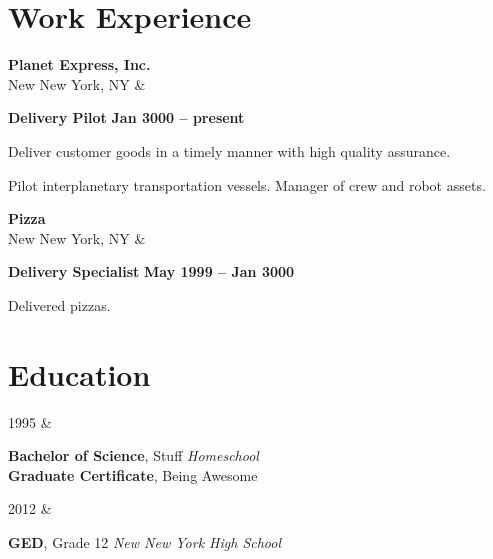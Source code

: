 \documentclass{article}
\begin{document}
  \section*{Work Experience}
      \begin{CvTable}
      	\textbf{Planet Express, Inc.} \\ New New York, NY & \parbox[t]{0.85\textwidth}{%
      		\textbf{Delivery Pilot} \hfill \textbf{Jan 3000 -- present}

      		\begin{citemize}
      			\item Deliver customer goods in a timely manner with high quality assurance.

      			\item Pilot interplanetary transportation vessels. Manager of crew and robot assets.

      		\end{citemize}

      	}
      \end{CvTable} %

      \begin{CvTable}
      	\textbf{Pizza} \\ New New York, NY & \parbox[t]{0.85\textwidth}{%
      		\textbf{Delivery Specialist} \hfill \textbf{May 1999 -- Jan 3000}

      		\begin{citemize}
      			\item Delivered pizzas.

      		\end{citemize}

      	}
      \end{CvTable} %

  \section*{Education}

      \begin{CvTable}
          1995 & \parbox[t]{0.85\textwidth}{%
              \textbf{Bachelor of Science}, Stuff \hfill \textit{Homeschool} \\\textbf{Graduate Certificate}, Being Awesome
          }
      \end{CvTable} %
      \begin{CvTable}
          2012 & \parbox[t]{0.85\textwidth}{%
              \textbf{GED}, Grade 12 \hfill \textit{New New York High School}
          }
      \end{CvTable}
\end{document}
